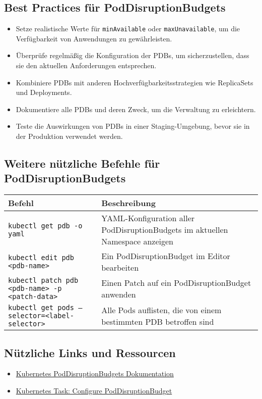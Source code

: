 \subsection{Best Practices für PodDisruptionBudgets}
\begin{itemize}
    \item Setze realistische Werte für \texttt{minAvailable} oder \texttt{maxUnavailable}, um die Verfügbarkeit von Anwendungen zu gewährleisten.
    \item Überprüfe regelmäßig die Konfiguration der PDBs, um sicherzustellen, dass sie den aktuellen Anforderungen entsprechen.
    \item Kombiniere PDBs mit anderen Hochverfügbarkeitsstrategien wie ReplicaSets und Deployments.
    \item Dokumentiere alle PDBs und deren Zweck, um die Verwaltung zu erleichtern.
    \item Teste die Auswirkungen von PDBs in einer Staging-Umgebung, bevor sie in der Produktion verwendet werden.
\end{itemize}

\subsection{Weitere nützliche Befehle für PodDisruptionBudgets}
\begin{tabular}{|p{}|p{}|}
\hline
\textbf{Befehl} & \textbf{Beschreibung} \\
\hline
\texttt{kubectl get pdb -o yaml} & YAML-Konfiguration aller PodDisruptionBudgets im aktuellen Namespace anzeigen \\
\texttt{kubectl edit pdb <pdb-name>} & Ein PodDisruptionBudget im Editor bearbeiten \\
\texttt{kubectl patch pdb <pdb-name> -p <patch-data>} & Einen Patch auf ein PodDisruptionBudget anwenden \\
\texttt{kubectl get pods --selector=<label-selector>} & Alle Pods auflisten, die von einem bestimmten PDB betroffen sind \\
\hline
\end{tabular}

\subsection{Nützliche Links und Ressourcen}
\begin{itemize}
    \item \href{https://kubernetes.io/docs/concepts/workloads/pods/disruptions/}{Kubernetes PodDisruptionBudgets Dokumentation}
    \item \href{https://kubernetes.io/docs/tasks/run-application/configure-pdb/}{Kubernetes Task: Configure PodDisruptionBudget}
\end{itemize}
